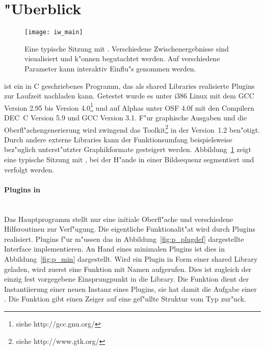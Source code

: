 \section{"Uberblick}

\begin{figure}[htb]
  \begin{center}
    \texttt{[image: iw\_main]}
  \end{center}
  \caption[Eine typische Sitzung mit \icewing{}]
  {Eine typische Sitzung mit \icewing{}. Verschiedene
    Zwischenergebnisse sind visualisiert und k"onnen begutachtet
    werden. Auf verschiedene Parameter kann interaktiv Einflu"s
    genommen werden.}
  \label{fig:p_icewing}
\end{figure}

\icewing{} ist ein in C geschriebenes Programm, das als shared
Libraries  realisierte Plugins zur Laufzeit
nachladen kann. Getestet wurde es unter i386 Linux mit dem GCC
Version 2.95 bis Version 4.0\footnote{siehe http://gcc.gnu.org/} und
auf Alphas unter OSF 4.0f mit den Compilern DEC~C Version 5.9 und
GCC Version 3.1. F"ur graphische Ausgaben und die
Oberfl"achengenerierung wird zwingend das 
Toolkit\footnote{siehe http://www.gtk.org/} in der Version~1.2
ben"otigt. Durch andere externe Libraries kann der Funktionsumfang
beispielsweise bez"uglich unterst"utzter Graphikformate gesteigert
werden. Abbildung~\ref{fig:p_icewing} zeigt eine typische Sitzung
mit \icewing{}, bei der H"ande in einer Bildsequenz segmentiert und
verfolgt werden.

\paragraph{Plugins in \icewing{}}\hfill\\

Das Hauptprogramm \icewing{} stellt nur eine initiale Oberfl"ache
und verschiedene Hilfsroutinen zur Verf"ugung. Die eigentliche
Funktionalit"at wird durch Plugins realisiert. Plugins f"ur
\icewing{} m"ussen das in Abbildung~\ref{fig:p_plugdef}
dargestellte Interface implementieren. An Hand eines minimalen
Plugins ist dies in Abbildung~\ref{fig:p_min} dargestellt. Wird ein
Plugin in Form einer shared Library geladen, wird zuerst eine
Funktion mit Namen  aufgerufen. Dies
ist zugleich der einzig fest vorgegebene Einsprungpunkt in die
Library. Die Funktion dient der Instantiierung einer neuen Instanz
eines Plugins, sie hat damit die Aufgabe einer
. Die Funktion gibt einen Zeiger auf eine
gef"ullte Struktur vom Typ  zur"uck.

